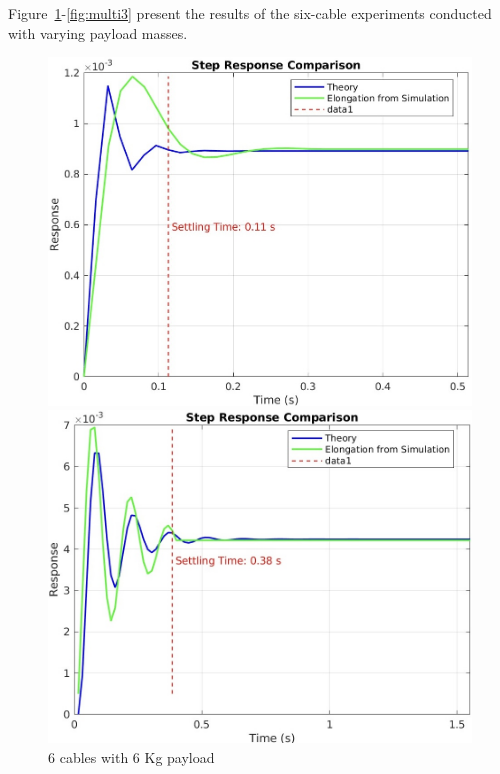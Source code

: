 \documentclass[12pt,twoside,letterpaper]{article}
\begin{document}
Figure~\ref{fig:multi1}-\ref{fig:multi3} present the results of the six-cable experiments conducted with varying payload masses.
\begin{figure}[H]
    \centering
    \begin{minipage}{0.32\textwidth}
        \centering
        \includegraphics[width=\linewidth]{figures/multi_6.jpg}
        \caption{6 cables with 6 Kg payload}
        \label{fig:multi1}
    \end{minipage}
    \hfill
    \begin{minipage}{0.32\textwidth}
        \centering
        \includegraphics[width=\linewidth]{figures/multi_30.jpg}

\end{minipage}
\end{figure}
\end{document}
